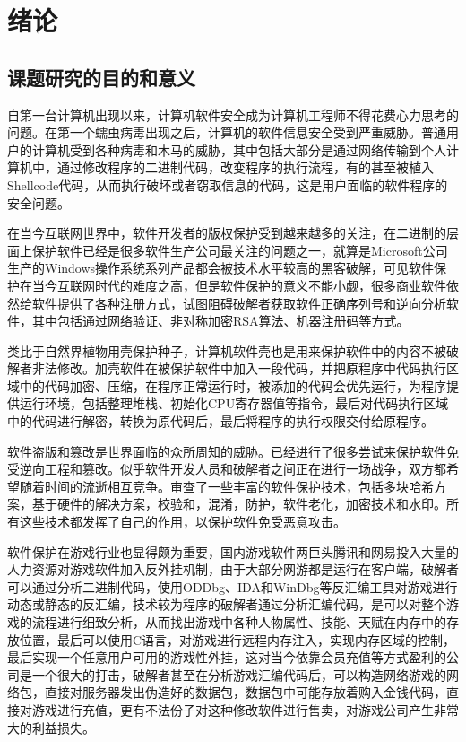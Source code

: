 \chapter{绪论}
\label{cha:intro}

\section{课题研究的目的和意义}
自第一台计算机出现以来，计算机软件安全成为计算机工程师不得花费心力思考的问题。在第一个蠕虫病毒出现之后，计算机的软件信息安全受到严重威胁。普通用户的计算机受到各种病毒和木马的威胁，其中包括大部分是通过网络传输到个人计算机中，通过修改程序的二进制代码，改变程序的执行流程，有的甚至被植入Shellcode代码，从而执行破坏或者窃取信息的代码，这是用户面临的软件程序的安全问题。

在当今互联网世界中，软件开发者的版权保护受到越来越多的关注，在二进制的层面上保护软件已经是很多软件生产公司最关注的问题之一，就算是Microsoft公司生产的Windows操作系统系列产品都会被技术水平较高的黑客破解\cite{芦天亮2020计算机病毒中的密码算法应用及防御方法综述}，可见软件保护在当今互联网时代的难度之高，但是软件保护的意义不能小觑，很多商业软件依然给软件提供了各种注册方式，试图阻碍破解者获取软件正确序列号和逆向分析软件，其中包括通过网络验证、非对称加密RSA算法、机器注册码等方式。

类比于自然界植物用壳保护种子，计算机软件壳也是用来保护软件中的内容不被破解者非法修改。加壳软件在被保护软件中加入一段代码，并把原程序中代码执行区域中的代码加密、压缩，在程序正常运行时，被添加的代码会优先运行，为程序提供运行环境，包括整理堆栈、初始化CPU寄存器值等指令，最后对代码执行区域中的代码进行解密，转换为原代码后，最后将程序的执行权限交付给原程序。

软件盗版和篡改是世界面临的众所周知的威胁。已经进行了很多尝试来保护软件免受逆向工程和篡改。似乎软件开发人员和破解者之间正在进行一场战争，双方都希望随着时间的流逝相互竞争。审查了一些丰富的软件保护技术\cite{王欢2020构建高效}，包括多块哈希方案，基于硬件的解决方案，校验和，混淆，防护，软件老化，加密技术和水印。所有这些技术都发挥了自己的作用，以保护软件免受恶意攻击。

软件保护在游戏行业也显得颇为重要，国内游戏软件两巨头腾讯和网易投入大量的人力资源对游戏软件加入反外挂机制，由于大部分网游都是运行在客户端，破解者可以通过分析二进制代码，使用ODDbg、IDA和WinDbg等反汇编工具对游戏进行动态或静态的反汇编\cite{徐君锋2017Android}，技术较为程序的破解者通过分析汇编代码，是可以对整个游戏的流程进行细致分析，从而找出游戏中各种人物属性、技能、天赋在内存中的存放位置，最后可以使用C语言，对游戏进行远程内存注入，实现内存区域的控制，最后实现一个任意用户可用的游戏性外挂，这对当今依靠会员充值等方式盈利的公司是一个很大的打击，破解者甚至在分析游戏汇编代码后，可以构造网络游戏的网络包，直接对服务器发出伪造好的数据包，数据包中可能存放着购入金钱代码，直接对游戏进行充值，更有不法份子对这种修改软件进行售卖\cite{简容2019一种多层次的自动化通用}，对游戏公司产生非常大的利益损失。

